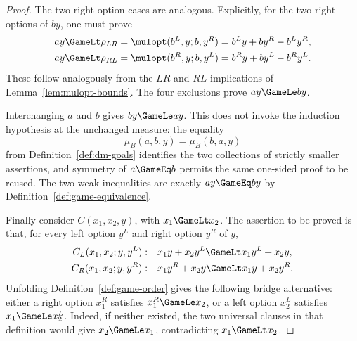 \begin{proof}
  The two right-option cases are analogous.  Explicitly, for the two right
  options of \(by\), one must prove
  \[
    \begin{aligned}
      ay&\GameLt \rho_{LR}
        =\mulopt(b^L,y;b,y^R)=b^Ly+by^R-b^Ly^R,\\
      ay&\GameLt \rho_{RL}
        =\mulopt(b^R,y;b,y^L)=b^Ry+by^L-b^Ry^L.
    \end{aligned}
  \]
  These follow analogously from the \(LR\) and \(RL\) implications of
  Lemma~\ref{lem:mulopt-bounds}.  The four exclusions prove \(ay\GameLe by\).

  Interchanging \(a\) and \(b\) gives \(by\GameLe ay\).  This does not invoke
  the induction hypothesis at the unchanged measure: the equality
  \[
    \mu_B(a,b,y)=\mu_B(b,a,y)
  \]
  from Definition~\ref{def:dm-goals} identifies the two collections of
  strictly smaller assertions, and symmetry of \(a\GameEq b\) permits the
  same one-sided proof to be reused.  The two weak inequalities are exactly
  \(ay\GameEq by\) by Definition~\ref{def:game-equivalence}.

  Finally consider \(C(x_1,x_2,y)\), with \(x_1\GameLt x_2\).  The assertion
  to be proved is that, for every left option \(y^L\) and right option \(y^R\)
  of \(y\),
  \[
    \begin{aligned}
      C_L(x_1,x_2;y,y^L):\quad
        &x_1y+x_2y^L\GameLt x_1y^L+x_2y,\\
      C_R(x_1,x_2;y,y^R):\quad
        &x_1y^R+x_2y\GameLt x_1y+x_2y^R.
    \end{aligned}
  \]
  Unfolding Definition~\ref{def:game-order} gives the following bridge
  alternative: either a right option \(x_1^R\) satisfies
  \(x_1^R\GameLe x_2\), or a left option \(x_2^L\) satisfies
  \(x_1\GameLe x_2^L\).  Indeed, if neither existed, the two universal clauses
  in that definition would give \(x_2\GameLe x_1\), contradicting
  \(x_1\GameLt x_2\).


\end{proof}
